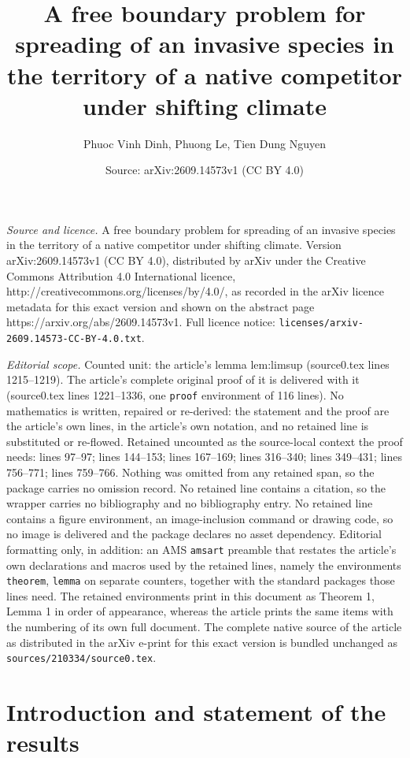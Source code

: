 \documentclass[10pt,a4paper]{amsart}
\title{A free boundary problem for spreading of an invasive species in the territory of a native competitor under shifting climate}
\author{Phuoc Vinh Dinh, Phuong Le, Tien Dung Nguyen}
\date{Source: arXiv:2609.14573v1 (CC BY 4.0)}
\begin{document}
\maketitle

\noindent\emph{Source and licence.} A free boundary problem for spreading of an invasive species in the territory of a native competitor under shifting climate. Version arXiv:2609.14573v1 (CC BY 4.0), distributed by arXiv under the Creative Commons Attribution 4.0 International licence, http://creativecommons.org/licenses/by/4.0/, as recorded in the arXiv licence metadata for this exact version and shown on the abstract page https://arxiv.org/abs/2609.14573v1. Full licence notice: \texttt{licenses/arxiv-2609.14573-CC-BY-4.0.txt}.\par\smallskip

\noindent\textit{Editorial scope.} Counted unit: the article's lemma lem:limsup (source0.tex lines 1215--1219). The article's complete original proof of it is delivered with it (source0.tex lines 1221--1336, one \texttt{proof} environment of 116 lines). No mathematics is written, repaired or re-derived: the statement and the proof are the article's own lines, in the article's own notation, and no retained line is substituted or re-flowed.  Retained uncounted as the source-local context the proof needs: lines 97--97; lines 144--153; lines 167--169; lines 316--340; lines 349--431; lines 756--771; lines 759--766.  Nothing was omitted from any retained span, so the package carries no omission record.  No retained line contains a citation, so the wrapper carries no bibliography and no bibliography entry.  No retained line contains a figure environment, an image-inclusion command or drawing code, so no image is delivered and the package declares no asset dependency.  Editorial formatting only, in addition: an AMS \texttt{amsart} preamble that restates the article's own declarations and macros used by the retained lines, namely the environments \texttt{theorem}, \texttt{lemma} on separate counters, together with the standard packages those lines need.  The retained environments print in this document as Theorem 1, Lemma 1 in order of appearance, whereas the article prints the same items with the numbering of its own full document.  The complete native source of the article as distributed in the arXiv e-print for this exact version is bundled unchanged as \texttt{sources/210334/source0.tex}.
	\section{Introduction and statement of the results}\label{sec_1}
\end{document}
